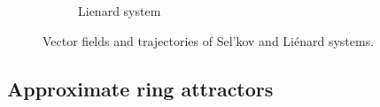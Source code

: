 \documentclass{article}
\theoremstyle{definition} \newtheorem{definition}{Definition}  \newtheorem{example}{Example}
\theoremstyle{remark} \newtheorem{remark}{Remark}
\newcounter{ct}
\begin{document}
\begin{figure}[htbp]
\begin{subfigure}[b]{0.48\linewidth}
        \caption{Lienard system}
        \label{fig:lienard_vf_trajs}
    \end{subfigure}
    \caption{Vector fields and trajectories of Sel'kov and Li\'enard systems.}
    \label{fig:selkov_lienard_combined}
\end{figure}





\FloatBarrier
\subsection{Approximate ring attractors}
\end{document}
